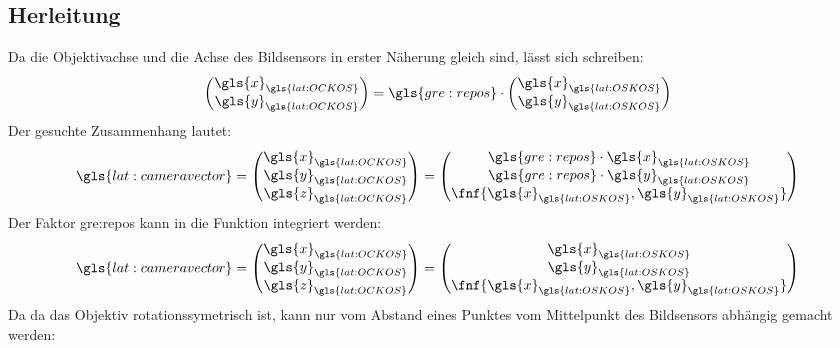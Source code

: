 \subsection{Herleitung}
Da die Objektivachse und die Achse des Bildsensors in erster Näherung gleich sind, lässt sich schreiben:
\begin{equation}
\begin{pmatrix}
\gls{x}_{\gls{lat:OCKOS}} \\ \gls{y}_{\gls{lat:OCKOS}}
\end{pmatrix}
= \gls{gre:repos} \cdot
\begin{pmatrix}
\gls{x}_{\gls{lat:OSKOS}} \\ \gls{y}_{\gls{lat:OSKOS}}
\end{pmatrix}
\end{equation}
Der gesuchte Zusammenhang lautet: 
\begin{equation}
\gls{lat:cameravector} =
\begin{pmatrix}
\gls{x}_{\gls{lat:OCKOS}} \\ \gls{y}_{\gls{lat:OCKOS}} \\ \gls{z}_{\gls{lat:OCKOS}}
\end{pmatrix}
=
\begin{pmatrix}
\gls{gre:repos} \cdot \gls{x}_{\gls{lat:OSKOS}} \\  \gls{gre:repos} \cdot \gls{y}_{\gls{lat:OSKOS}} \\ \fnf{\gls{x}_{\gls{lat:OSKOS}},\gls{y}_{\gls{lat:OSKOS}}}
\end{pmatrix}
\end{equation}
Der Faktor  \gls{gre:repos} kann in die Funktion  integriert werden:
\begin{equation}
\label{eq:ocamcalibuv}
\gls{lat:cameravector} =
\begin{pmatrix}
\gls{x}_{\gls{lat:OCKOS}} \\ \gls{y}_{\gls{lat:OCKOS}} \\ \gls{z}_{\gls{lat:OCKOS}}
\end{pmatrix}
=
\begin{pmatrix}
\gls{x}_{\gls{lat:OSKOS}} \\ \gls{y}_{\gls{lat:OSKOS}} \\ \fnf{\gls{x}_{\gls{lat:OSKOS}},\gls{y}_{\gls{lat:OSKOS}}}
\end{pmatrix}
\end{equation}
Da da das Objektiv rotationssymetrisch ist, kann  nur vom Abstand eines Punktes vom Mittelpunkt des Bildsensors abhängig gemacht werden:
